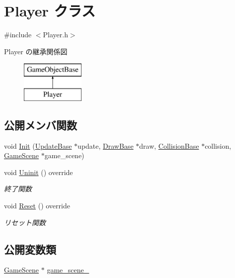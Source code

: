 \hypertarget{class_player}{}\section{Player クラス}
\label{class_player}


{\ttfamily \#include $<$Player.\+h$>$}

Player の継承関係図\begin{figure}[H]
\begin{center}
\leavevmode
\includegraphics[height=2.000000cm]{class_player}
\end{center}
\end{figure}
\subsection*{公開メンバ関数}
\begin{DoxyCompactItemize}
\item 
void \mbox{\hyperlink{class_player_a171167a4b1a6dddbe94b8f3c6f7462c4}{Init}} (\mbox{\hyperlink{class_update_base}{Update\+Base}} $\ast$update, \mbox{\hyperlink{class_draw_base}{Draw\+Base}} $\ast$draw, \mbox{\hyperlink{class_collision_base}{Collision\+Base}} $\ast$collision, \mbox{\hyperlink{class_game_scene}{Game\+Scene}} $\ast$game\+\_\+scene)
\item 
void \mbox{\hyperlink{class_player_a7455a83ac23d2f5e0cce0ddd7d92db0c}{Uninit}} () override
\begin{DoxyCompactList}\small\item\em 終了関数 \end{DoxyCompactList}\item 
void \mbox{\hyperlink{class_player_a457153d0edd58932e37e1356f5fe5fed}{Reset}} () override
\begin{DoxyCompactList}\small\item\em リセット関数 \end{DoxyCompactList}\end{DoxyCompactItemize}
\subsection*{公開変数類}
\begin{DoxyCompactItemize}
\item 
\mbox{\hyperlink{class_game_scene}{Game\+Scene}} $\ast$ \mbox{\hyperlink{class_player_ab41e7ebf6f975f2eea365923bc2dca7f}{game\+\_\+scene\+\_\+}}
\end{DoxyCompactItemize}
